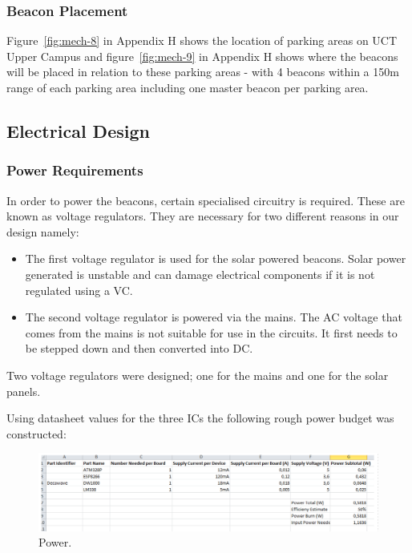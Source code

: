 \subsubsection{Beacon Placement}
Figure~\ref{fig:mech-8} in Appendix H  shows the location of parking areas on UCT Upper Campus and figure~\ref{fig:mech-9} in Appendix H shows where the beacons will be placed in relation to these parking areas - with 4 beacons within a 150m range of each parking area including one master beacon per parking area.

\newpage
\subsection{Electrical Design} 
\subsubsection{Power Requirements}
In order to power the beacons, certain specialised circuitry is required. These are known as voltage regulators. They are necessary for two different reasons in our design namely:

\begin{itemize}
\item The first voltage regulator is used for the solar powered beacons. Solar power generated is unstable and can damage electrical components if it is not regulated using a VC.
\item The second voltage regulator is powered via the mains. The AC voltage that comes from the mains is not suitable for use in the circuits. It first needs to be stepped down and then converted into DC.
\end{itemize}

Two voltage regulators were designed; one for the mains and one for the solar panels.

Using datasheet values for the three ICs the following rough power budget was constructed:

\begin{figure}[H]
\begin{center}
\includegraphics[scale=0.4]{data/power/1.png}
\caption{Power.}
\label{fig:pow-1}
\end{center}
\end{figure}

